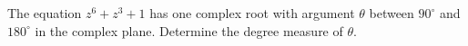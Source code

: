 The equation $z^6 + z^3 + 1$ has one complex root with argument $\theta$ between $90^\circ$ and $180^\circ$ in the complex plane.  Determine the degree measure of $\theta$.